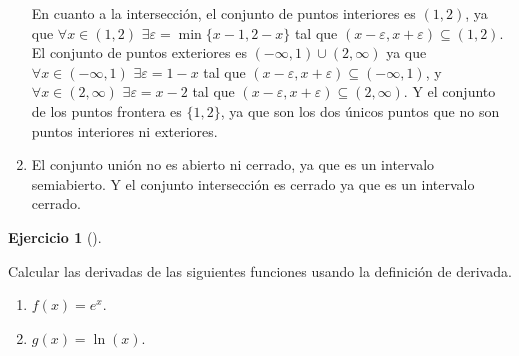 \documentclass[
  a4paper,
]{scrreport}
\providecommand{\tightlist}{%
  \setlength{\itemsep}{0pt}\setlength{\parskip}{0pt}}\usepackage{longtable,booktabs,array}
\theoremstyle{definition}
\newtheorem{exercise}{Ejercicio}[chapter]
\theoremstyle{remark}
\begin{document}
\begin{tcolorbox}
\begin{enumerate}
  En cuanto a la intersección, el conjunto de puntos interiores es
  \((1,2)\), ya que \(\forall x\in(1,2)\)
  \(\exists \varepsilon=\min\{x-1,2-x\}\) tal que
  \((x-\varepsilon, x+\varepsilon)\subseteq (1,2)\). El conjunto de
  puntos exteriores es \((-\infty,1)\cup(2,\infty)\) ya que
  \(\forall x\in (-\infty, 1)\) \(\exists \varepsilon = 1-x\) tal que
  \((x-\varepsilon,x+\varepsilon)\subseteq (-\infty, 1)\), y
  \(\forall x\in (2,\infty)\) \(\exists \varepsilon = x-2\) tal que
  \((x-\varepsilon,x+\varepsilon)\subseteq (2,\infty)\). Y el conjunto
  de los puntos frontera es \(\{1,2\}\), ya que son los dos únicos
  puntos que no son puntos interiores ni exteriores.
\item
  El conjunto unión no es abierto ni cerrado, ya que es un intervalo
  semiabierto. Y el conjunto intersección es cerrado ya que es un
  intervalo cerrado.
\end{enumerate}

\end{tcolorbox}

\begin{exercise}[]\protect\hypertarget{exr-2}{}\label{exr-2}

Calcular las derivadas de las siguientes funciones usando la definición
de derivada.

\begin{enumerate}
\def\labelenumi{\alph{enumi}.}
\tightlist
\item
  \(f(x)=e^x\).
\item
  \(g(x)=\ln(x)\).
\end{enumerate}

\end{exercise}
\end{document}
